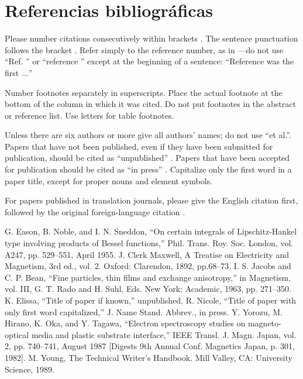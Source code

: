 \documentclass[conference]{IEEEtran}
\begin{document}
\section*{Referencias bibliográficas}

Please number citations consecutively within brackets \cite{b1}. The 
sentence punctuation follows the bracket \cite{b2}. Refer simply to the reference 
number, as in \cite{b3}---do not use ``Ref. \cite{b3}'' or ``reference \cite{b3}'' except at 
the beginning of a sentence: ``Reference \cite{b3} was the first $\ldots$''

Number footnotes separately in superscripts. Place the actual footnote at 
the bottom of the column in which it was cited. Do not put footnotes in the 
abstract or reference list. Use letters for table footnotes.

Unless there are six authors or more give all authors' names; do not use 
``et al.''. Papers that have not been published, even if they have been 
submitted for publication, should be cited as ``unpublished'' \cite{b4}. Papers 
that have been accepted for publication should be cited as ``in press'' \cite{b5}. 
Capitalize only the first word in a paper title, except for proper nouns and 
element symbols.

For papers published in translation journals, please give the English 
citation first, followed by the original foreign-language citation \cite{b6}.

\begin{thebibliography}{00}
 G. Eason, B. Noble, and I. N. Sneddon, ``On certain integrals of Lipschitz-Hankel type involving products of Bessel functions,'' Phil. Trans. Roy. Soc. London, vol. A247, pp. 529--551, April 1955.
 J. Clerk Maxwell, A Treatise on Electricity and Magnetism, 3rd ed., vol. 2. Oxford: Clarendon, 1892, pp.68--73.
 I. S. Jacobs and C. P. Bean, ``Fine particles, thin films and exchange anisotropy,'' in Magnetism, vol. III, G. T. Rado and H. Suhl, Eds. New York: Academic, 1963, pp. 271--350.
 K. Elissa, ``Title of paper if known,'' unpublished.
 R. Nicole, ``Title of paper with only first word capitalized,'' J. Name Stand. Abbrev., in press.
 Y. Yorozu, M. Hirano, K. Oka, and Y. Tagawa, ``Electron spectroscopy studies on magneto-optical media and plastic substrate interface,'' IEEE Transl. J. Magn. Japan, vol. 2, pp. 740--741, August 1987 [Digests 9th Annual Conf. Magnetics Japan, p. 301, 1982].
 M. Young, The Technical Writer's Handbook. Mill Valley, CA: University Science, 1989.
\end{thebibliography}
\end{document}
